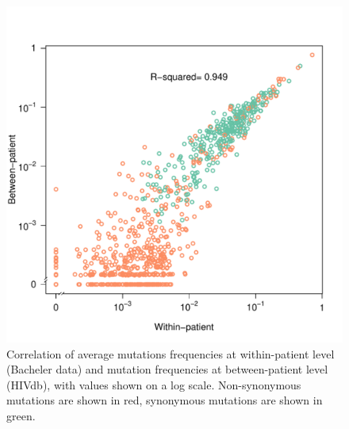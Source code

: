 \documentclass{article}
\begin{document}
\begin{figure}[ht!]
\centering
\includegraphics[scale = .65]{F5eLife.pdf}
\caption{Correlation of average mutations frequencies at within-patient level (Bacheler data) and mutation frequencies at between-patient level (HIVdb), with values shown on a log scale. Non-synonymous mutations are shown in red, synonymous mutations are shown in green. }
\label{StanfordVSBacheler} 
\end{figure}


\pagebreak
\end{document}
